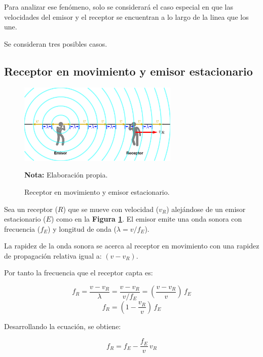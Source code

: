 \documentclass[letter,11pt]{article}
\newcommand{\source}[1]{\vspace{-11pt} \caption*{\small{\textbf{Nota:} {#1}}}}
\begin{document}
Para analizar ese fenómeno, solo se considerará el caso especial en que las
velocidades del emisor y el receptor se encuentran a lo largo de la linea que
los une.

Se consideran tres posibles casos.

\subsection{Receptor en movimiento y emisor estacionario}

\begin{figure}
\centering
\includegraphics[width=0.68\textwidth]{resources/f2.eps}
\caption{Receptor en movimiento y emisor estacionario.}
\label{figura2}
\source{Elaboración propia.}
\end{figure}

Sea un receptor ($R$) que se mueve con velocidad ($v_R$) alejándose de un emisor
estacionario ($E$) como en la \textbf{Figura \ref{figura2}}. El emisor emite una
onda sonora con frecuencia ($f_E$) y longitud de onda ($\lambda = v/f_E$).

La rapidez de la onda sonora se acerca al receptor en movimiento con una rapidez
de propagación relativa igual a: $(v - v_R)$.

Por tanto la frecuencia que el receptor capta es:

\begin{equation*}
    f_R = \frac{v - v_R}{\lambda}
        = \frac{v - v_R}{v / f_E}
        = \left(\frac{v - v_R}{v}\right)\, f_E
\end{equation*}
\begin{equation}
    f_R = \left(1 - \frac{v_R}{v}\right)\, f_E
\end{equation}
\vspace{0.10cm}

Desarrollando la ecuación, se obtiene:

\begin{equation}
    f_R = f_E - \frac{f_E}{v}\,v_R
\label{funcional1}
\end{equation}
\vspace{0.10cm}
\end{document}
